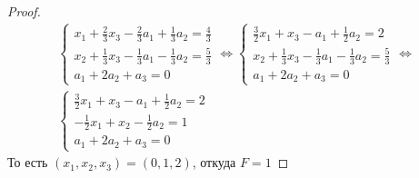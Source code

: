 \begin{proof}
\begin{gather*}
    \begin{cases}
        x_1 + \frac{2}{3}x_3 - \frac{2}{3}a_1 + \frac{1}{3}a_2 = \frac{4}{3}\\
        x_2 + \frac{1}{3}x_3 - \frac{1}{3}a_1 - \frac{1}{3}a_2 = \frac{5}{3}\\
        a_1 + 2a_2 + a_3 = 0
    \end{cases}
    \Leftrightarrow
    \begin{cases}
        \frac{3}{2}x_1 + x_3 - a_1 + \frac{1}{2}a_2 = 2\\
        x_2 + \frac{1}{3}x_3 - \frac{1}{3}a_1 - \frac{1}{3}a_2 = \frac{5}{3}\\
        a_1 + 2a_2 + a_3 = 0
    \end{cases}
    \Leftrightarrow\\
    \begin{cases}
        \frac{3}{2}x_1 + x_3 - a_1 + \frac{1}{2}a_2 = 2\\
        -\frac{1}{2}x_1 + x_2 - \frac{1}{2}a_2 = 1\\
        a_1 + 2a_2 + a_3 = 0
    \end{cases}
    \end{gather*}
    То есть $(x_1, x_2, x_3) = (0, 1, 2)$, откуда $F = 1$
\end{proof}

